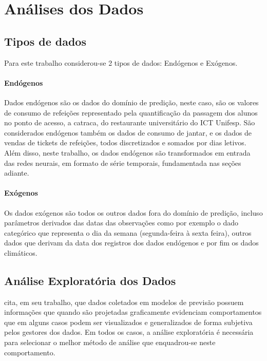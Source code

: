 \documentclass[	12pt, Times, openright, twoside, a4paper, english, brazil]{abntex2}
\begin{document}
      \section{Análises dos Dados}
        \subsection{Tipos de dados}
            Para este trabalho considerou-se 2 tipos de dados: Endógenos e Exógenos.
            \paragraph{Endógenos}
            Dados endógenos são os dados do domínio de predição, neste caso, são os valores de consumo de refeições representado pela quantificação da passagem dos alunos no ponto de acesso, a catraca, do restaurante universitário do ICT Unifesp.
            São considerados endógenos também os dados de consumo de jantar, e os dados de vendas de tickets de refeições, todos discretizados e somados por dias letivos. Além disso, neste trabalho, os dados endógenos são transformados em entrada das redes neurais, em formato de série temporais, fundamentada nas seções adiante.
            
            \paragraph{Exógenos}
            Os dados exógenos são todos os outros dados fora do domínio de predição, incluso parâmetros derivados das datas das observações como por exemplo o dado categórico que representa o dia da semana (segunda-feira à sexta feira), outros dados que derivam da data dos registros dos dados endógenos e por fim os dados climáticos.
            
        \subsection{Análise Exploratória dos Dados}
          \cite{Junior2007} cita, em seu trabalho, que dados coletados em modelos de previsão possuem informações que quando são projetadas graficamente evidenciam comportamentos que em alguns casos podem ser visualizados e generalizados de forma subjetiva pelos gestores dos dados.  
          Em todos os casos, a análise exploratória é necessária para selecionar o melhor método de análise que enquadrou-se neste comportamento.
\end{document}

